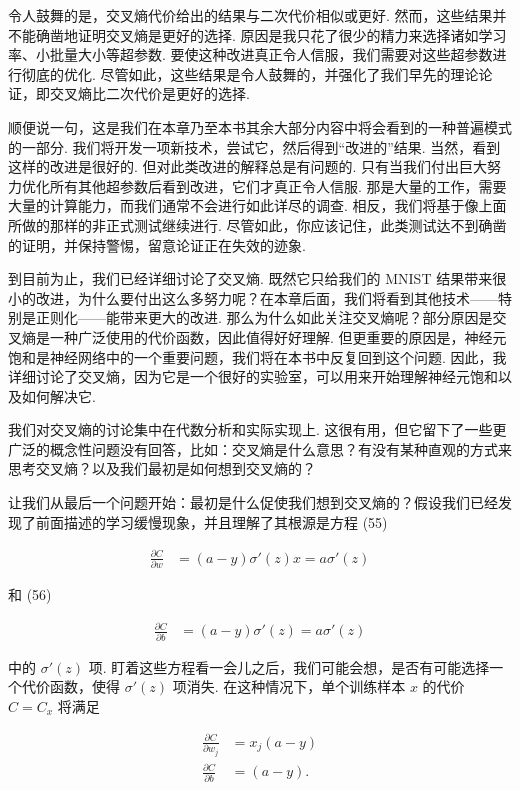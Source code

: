 令人鼓舞的是，交叉熵代价给出的结果与二次代价相似或更好. 然而，这些结果并不能确凿地证明交叉熵是更好的选择. 原因是我只花了很少的精力来选择诸如学习率、小批量大小等超参数. 要使这种改进真正令人信服，我们需要对这些超参数进行彻底的优化. 尽管如此，这些结果是令人鼓舞的，并强化了我们早先的理论论证，即交叉熵比二次代价是更好的选择.

顺便说一句，这是我们在本章乃至本书其余大部分内容中将会看到的一种普遍模式的一部分. 我们将开发一项新技术，尝试它，然后得到``改进的''结果. 当然，看到这样的改进是很好的. 但对此类改进的解释总是有问题的. 只有当我们付出巨大努力优化所有其他超参数后看到改进，它们才真正令人信服. 那是大量的工作，需要大量的计算能力，而我们通常不会进行如此详尽的调查. 相反，我们将基于像上面所做的那样的非正式测试继续进行. 尽管如此，你应该记住，此类测试达不到确凿的证明，并保持警惕，留意论证正在失效的迹象.

到目前为止，我们已经详细讨论了交叉熵. 既然它只给我们的 MNIST 结果带来很小的改进，为什么要付出这么多努力呢？在本章后面，我们将看到其他技术——特别是正则化——能带来更大的改进. 那么为什么如此关注交叉熵呢？部分原因是交叉熵是一种广泛使用的代价函数，因此值得好好理解. 但更重要的原因是，神经元饱和是神经网络中的一个重要问题，我们将在本书中反复回到这个问题. 因此，我详细讨论了交叉熵，因为它是一个很好的实验室，可以用来开始理解神经元饱和以及如何解决它.

我们对交叉熵的讨论集中在代数分析和实际实现上. 这很有用，但它留下了一些更广泛的概念性问题没有回答，比如：交叉熵是什么意思？有没有某种直观的方式来思考交叉熵？以及我们最初是如何想到交叉熵的？

让我们从最后一个问题开始：最初是什么促使我们想到交叉熵的？假设我们已经发现了前面描述的学习缓慢现象，并且理解了其根源是方程 (55)

\begin{align*}
\frac{\partial C}{\partial w} &= (a-y)\sigma'(z) x = a \sigma'(z) \nonumber
\end{align*}

\noindent 和 (56)

\begin{align*}
\frac{\partial C}{\partial b} &= (a-y)\sigma'(z) = a \sigma'(z) \nonumber
\end{align*}

\noindent 中的 $\sigma'(z)$ 项. 盯着这些方程看一会儿之后，我们可能会想，是否有可能选择一个代价函数，使得 $\sigma'(z)$ 项消失. 在这种情况下，单个训练样本 $x$ 的代价 $C = C_x$ 将满足

\begin{align}
\frac{\partial C}{\partial w_j} &= x_j(a-y) \tag{71} \\ \frac{\partial C}{\partial b } &= (a-y). \tag{72}
\end{align}

